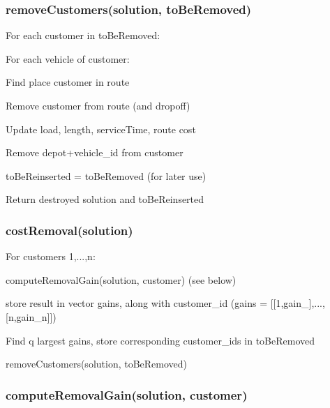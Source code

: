 \subsubsection*{remove\+Customers(solution, to\+Be\+Removed)}


\begin{DoxyEnumerate}
\item For each customer in to\+Be\+Removed\+:
\begin{DoxyItemize}
\item For each vehicle of customer\+:
\begin{DoxyItemize}
\item Find place customer in route
\item Remove customer from route (and dropoff)
\item Update load, length, service\+Time, route cost
\item Remove depot+vehicle\+\_\+id from customer
\end{DoxyItemize}
\end{DoxyItemize}
\item to\+Be\+Reinserted = to\+Be\+Removed (for later use)
\end{DoxyEnumerate}
\begin{DoxyEnumerate}
\item Return destroyed solution and to\+Be\+Reinserted
\end{DoxyEnumerate}

\subsubsection*{cost\+Removal(solution)}


\begin{DoxyEnumerate}
\item For customers 1,...,n\+:
\begin{DoxyItemize}
\item compute\+Removal\+Gain(solution, customer) (see below)
\item store result in vector gains, along with customer\+\_\+id (gains = \mbox{[}\mbox{[}1,gain\+\_\mbox{]},...,\mbox{[}n,gain\+\_\+n\mbox{]}\mbox{]})
\end{DoxyItemize}
\item Find q largest gains, store corresponding customer\+\_\+ids in to\+Be\+Removed
\item remove\+Customers(solution, to\+Be\+Removed)
\end{DoxyEnumerate}

\subsubsection*{compute\+Removal\+Gain(solution, customer)}


